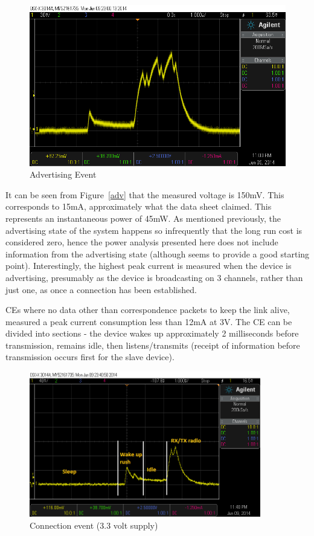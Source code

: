 \documentclass[]{article}
\begin{document}
\begin{figure}[htb]
	\begin{center}
		\includegraphics[width = \textwidth]{adv}
	\end{center}
	\caption{Advertising Event}
	\label{fig:adv}
\end{figure}

It can be seen from Figure~\ref{adv} that the measured voltage is 150mV. This corresponds to 15mA, approximately what the data sheet claimed. This represents an instantaneous power of 45mW. As mentioned previously, the advertising state of the system happens so infrequently that the long run cost is considered zero, hence the power analysis presented here does not include information from the advertising state (although \cite{Liu2012} seems to provide a good starting point). Interestingly, the highest peak current is measured when the device is advertising, presumably as the device is broadcasting on 3 channels, rather than just one, as once a connection has been established. 

\ac{CE}s where no data other than correspondence packets to keep the link alive, measured a peak current consumption less than 12mA at 3V. The \ac{CE} can be divided into sections - the device wakes up approximately 2 milliseconds before transmission, remains idle, then listens/transmits (receipt of information before transmission occurs first for the slave device). 

\begin{figure}[H]
	\begin{center}
		\includegraphics[width = 0.9\textwidth]{ceclose}
	\end{center}
	\caption{Connection event (3.3 volt supply)}
	\label{fig:ceclose}
\end{figure}
\end{document}
